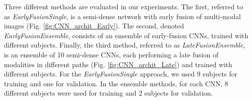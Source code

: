 \documentclass[twoside,espcrc2]{elsarticle}
\begin{document}
Three different methods are evaluated in our experiments. The first, referred to as \textit{EarlyFusionSingle}, is a semi-dense network with early fusion of multi-modal images (Fig. \ref{fig:CNN_archit_Early}). The second, denoted \textit{EarlyFusionEnsemble}, consists of an ensemble of  early-fusion CNNs, trained with different subjects. Finally, the third method, referred to as \textit{LateFusionEnsemble}, is an ensemble of 10 semi-dense CNNs, each performing a late fusion of modalities in different paths (Fig. \ref{fig:CNN_archit_Late}) and trained with different subjects. 
For the \textit{EarlyFusionSingle} approach, we used 9 subjects for training and one for validation. In the ensemble methods, for each CNN, 8 different subjects were used for training and 2 subjects for validation.

\begin{comment}
\begin{table}[ht!]
\centering
\small
\caption{Segmentation results from the iSEG-2017 Segmentation challenge for the top-5 ranked methods (21 teams participated in the challenge). The first set of results correspond to the three proposed approaches, and the second set to approaches presented by other competing teams. Bold fonts are employed to highlight the best performances for each metric and structure. For additional details, we refer the reader to the challenge's website\footnote{http://iseg2017.web.unc.edu/rules/results/}.}
\label{table:results}
\begin{tabular}{lccccccccc}
\toprule
\multirow{2}[3]{*}{\textbf{Method}} & \multicolumn{3}{c}{{CSF}} & \multicolumn{3}{c}{{GM}} & \multicolumn{3}{c}{{WM}}
\cmidrule(lr){2-4}\cmidrule(lr){5-7}\cmidrule(lr){8-10}\\
& {DSC} & {MHD} & {ASD} & \multicolumn{1}{l}{{DSC}} & \multicolumn{1}{l}{{MHD}} & \multicolumn{1}{l}{{ASD}} & \multicolumn{1}{l}{{DSC}} & \multicolumn{1}{l}{{MHD}} & \multicolumn{1}{l}{{ASD}} \\
\midrule
\textbf{EarlyFusionSingle}      & 0.953  & 9.296  & 0.128 & 0.916 & 7.131 & 0.346 & 0.895 & 6.903 & 0.406  \\
\textbf{EarlyFusionEnsemble} & 0.957 & \textbf{9.029} & 0.138 & \textbf{0.919} & 6.415  & 0.338  & 0.897  & 6.975  & \textbf{0.376}\\
\textbf{LateFusionEnsemble} & 0.957 & 9.127   & 0.119  &  0.918 & 6.060 & 0.344  & 0.895  & 7.451 & 0.409\\
\midrule
Bern\_IPMI & 0.954 & 9.616 & 0.127 & 0.916 & 6.455 & 0.341 & 0.896 & 6.782 & 0.398 \\
MSL\_SKKU & \textbf{0.958} & 9.072 & \textbf{0.116} & \textbf{0.919} & \textbf{5.980} & \textbf{0.330} & \textbf{0.901} & \textbf{6.444} & 0.391 \\
nic\_vicorob & 0.951 & 9.178 & 0.137 & 0.910 & 7.647 & 0.367 & 0.885 & 7.154 & 0.430 \\
TU/e IMAG/e & 0.947  & 9.426  & 0.150 & 0.904 & 6.856 & 0.375 & 0.890 & 6.908 & 0.433  \\

\bottomrule
\end{tabular}
\end{table}
\end{comment}
\end{document}
